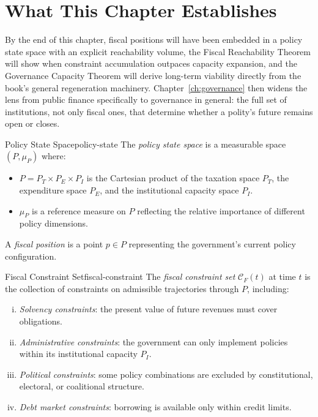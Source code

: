 \documentclass[12pt,twoside,openright]{book}
\begin{document}
\section{What This Chapter Establishes}
\label{sec:ch27-preview}

By the end of this chapter, fiscal positions will have been
embedded in a policy state space with an explicit reachability
volume, the Fiscal Reachability Theorem will show when
constraint accumulation outpaces capacity expansion, and the
Governance Capacity Theorem will derive long-term viability
directly from the book's general regeneration machinery.
Chapter~\ref{ch:governance} then widens the lens from public
finance specifically to governance in general: the full set of
institutions, not only fiscal ones, that determine whether a
polity's future remains open or closes.

\begin{definition}{Policy State Space}{policy-state}
  The \emph{policy state space} is a measurable space
  $(P, \mu_P)$ where:
  \begin{itemize}[nosep]
    \item $P = P_T \times P_E \times P_I$ is the
          Cartesian product of the taxation space $P_T$,
          the expenditure space $P_E$, and the
          institutional capacity space $P_I$.
    \item $\mu_P$ is a reference measure on $P$
          reflecting the relative importance of
          different policy dimensions.
  \end{itemize}
  A \emph{fiscal position} is a point $p \in P$
  representing the government's current policy
  configuration.
\end{definition}

\begin{definition}{Fiscal Constraint Set}{fiscal-constraint}
  The \emph{fiscal constraint set} $\mathcal{C}_F(t)$
  at time $t$ is the collection of constraints on
  admissible trajectories through $P$, including:
  \begin{enumerate}[(i)]
    \item \emph{Solvency constraints}: the present value
          of future revenues must cover obligations.
    \item \emph{Administrative constraints}: the government
          can only implement policies within its
          institutional capacity $P_I$.
    \item \emph{Political constraints}: some policy
          combinations are excluded by constitutional,
          electoral, or coalitional structure.
    \item \emph{Debt market constraints}: borrowing is
          available only within credit limits.
  \end{enumerate}
\end{definition}
\end{document}
